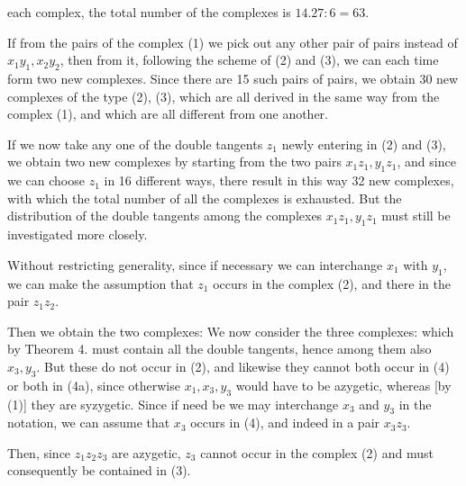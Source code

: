 each complex, the total number of the complexes is $14.27 : 6 = 63$.


If from the pairs of the complex (1) we pick out any other pair of pairs instead of $x_1 y_1, x_2 y_2$, then from it, following the scheme of (2) and (3), we can each time form two new complexes. Since there are 15 such pairs of pairs, we obtain 30 new complexes of the type (2), (3), which are all derived in the same way from the complex (1), and which are all different from one another.

If we now take any one of the double tangents $z_1$ newly entering in (2) and (3), we obtain two new complexes by starting from the two pairs $x_1 z_1, y_1 z_1$, and since we can choose $z_1$ in 16 different ways, there result in this way 32 new complexes, with which the total number of all the complexes is exhausted. But the distribution of the double tangents among the complexes $x_1 z_1, y_1 z_1$ must still be investigated more closely.

Without restricting generality, since if necessary we can interchange $x_1$ with $y_1$, we can make the assumption that $z_1$ occurs in the complex (2), and there in the pair $z_1 z_2$.

Then we obtain the two complexes:
We now consider the three complexes:
which by Theorem 4. must contain all the double tangents, hence among them also $x_3, y_3$. But these do not occur in (2), and likewise they cannot both occur in (4) or both in (4a), since otherwise $x_1, x_3, y_3$ would have to be azygetic, whereas [by (1)] they are syzygetic. Since if need be we may interchange $x_3$ and $y_3$ in the notation, we can assume that $x_3$ occurs in (4), and indeed in a pair $x_3 z_3$.

Then, since $z_1 z_2 z_3$ are azygetic, $z_3$ cannot occur in the complex (2) and must consequently be contained in (3).
